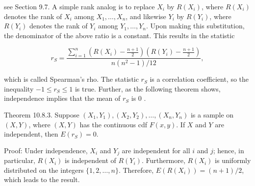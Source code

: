 see Section 9.7. A simple rank analog is to replace $X_{i}$ by $R\left(X_{i}\right)$, where $R\left(X_{i}\right)$ denotes the rank of $X_{i}$ among $X_{1}, \ldots, X_{n}$, and likewise $Y_{i}$ by $R\left(Y_{i}\right)$, where $R\left(Y_{i}\right)$ denotes the rank of $Y_{i}$ among $Y_{1}, \ldots, Y_{n}$. Upon making this substitution, the denominator of the above ratio is a constant. This results in the statistic


\begin{equation*}
r_{S}=\frac{\sum_{i=1}^{n}\left(R\left(X_{i}\right)-\frac{n+1}{2}\right)\left(R\left(Y_{i}\right)-\frac{n+1}{2}\right)}{n\left(n^{2}-1\right) / 12}, \tag{10.8.10}
\end{equation*}


which is called Spearman's rho. The statistic $r_{S}$ is a correlation coefficient, so the inequality $-1 \leq r_{S} \leq 1$ is true. Further, as the following theorem shows, independence implies that the mean of $r_{S}$ is 0 .

Theorem 10.8.3. Suppose $\left(X_{1}, Y_{1}\right),\left(X_{2}, Y_{2}\right), \ldots,\left(X_{n}, Y_{n}\right)$ is a sample on $(X, Y)$, where $(X, Y)$ has the continuous cdf $F(x, y)$. If $X$ and $Y$ are independent, then $E\left(r_{S}\right)=0$.

Proof: Under independence, $X_{i}$ and $Y_{j}$ are independent for all $i$ and $j$; hence, in particular, $R\left(X_{i}\right)$ is independent of $R\left(Y_{i}\right)$. Furthermore, $R\left(X_{i}\right)$ is uniformly distributed on the integers $\{1,2, \ldots, n\}$. Therefore, $E\left(R\left(X_{i}\right)\right)=(n+1) / 2$, which leads to the result.

